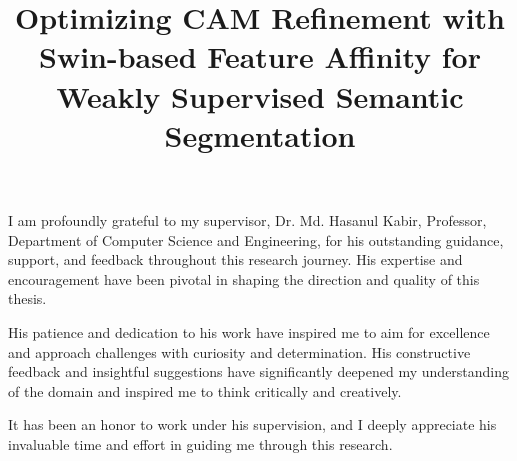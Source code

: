 \documentclass{iutbscthesis}
\title{\Large{Optimizing CAM Refinement with Swin-based Feature Affinity for Weakly Supervised Semantic Segmentation}}
\begin{document}

\coverpage


\titlepage

\declarationofcandidate


\tableofcontents
\listoffigures
\listoftables

\clearpage



\begin{acknowledgement}
    I am profoundly grateful to my supervisor, Dr. Md. Hasanul Kabir, Professor, Department of Computer Science and Engineering, for his outstanding guidance, support, and feedback throughout this research journey. His expertise and encouragement have been pivotal in shaping the direction and quality of this thesis.

His patience and dedication to his work have inspired me to aim for excellence and approach challenges with curiosity and determination. His constructive feedback and insightful suggestions have significantly deepened my understanding of the domain and inspired me to think critically and creatively.

It has been an honor to work under his supervision, and I deeply appreciate his invaluable time and effort in guiding me through this research.
\end{acknowledgement}
\end{document}
